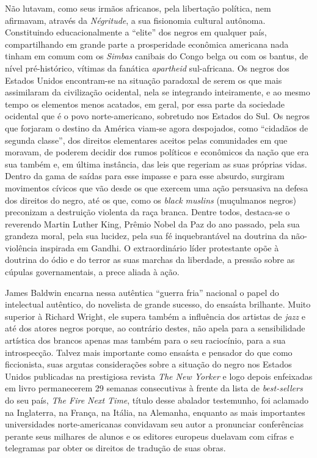 \documentclass[
  letterpaper,
  DIV=11,
  numbers=noendperiod]{scrreprt}
\begin{document}
Não lutavam, como seus irmãos africanos, pela libertação política, nem
afirmavam, através da \emph{Négritude}, a sua fisionomia cultural
autônoma. Constituindo educacionalmente a ``elite'' dos negros em
qualquer país, compartilhando em grande parte a prosperidade econômica
americana nada tinham em comum com os \emph{Simbas} canibais do Congo
belga ou com os bantus, de nível pré-histórico, vítimas da fanática
\emph{apartheid} sul-africana. Os negros dos Estados Unidos encontram-se
na situação paradoxal de serem os que mais assimilaram da civilização
ocidental, nela se integrando inteiramente, e ao mesmo tempo os
elementos menos acatados, em geral, por essa parte da sociedade
ocidental que é o povo norte-americano, sobretudo nos Estados do Sul. Os
negros que forjaram o destino da América viam-se agora despojados, como
``cidadãos de segunda classe'', dos direitos elementares aceitos pelas
comunidades em que moravam, de poderem decidir dos rumos políticos e
econômicos da nação que era sua também e, em última instância, das leis
que regeriam as suas próprias vidas. Dentro da gama de saídas para esse
impasse e para esse absurdo, surgiram movimentos cívicos que vão desde
os que exercem uma ação persuasiva na defesa dos direitos do negro, até
os que, como os \emph{black muslins} (muçulmanos negros) preconizam a
destruição violenta da raça branca. Dentre todos, destaca-se o reverendo
Martin Luther King, Prêmio Nobel da Paz do ano passado, pela sua
grandeza moral, pela sua lucidez, pela sua fé inquebrantável na doutrina
da não-violência inspirada em Gandhi. O extraordinário líder protestante
opõe à doutrina do ódio e do terror as suas marchas da liberdade, a
pressão sobre as cúpulas governamentais, a prece aliada à ação.

James Baldwin encarna nessa autêntica ``guerra fria'' nacional o papel
do intelectual autêntico, do novelista de grande sucesso, do ensaísta
brilhante. Muito superior à Richard Wright, ele supera também a
influência dos artistas de \emph{jazz} e até dos atores negros porque,
ao contrário destes, não apela para a sensibilidade artística dos
brancos apenas mas também para o seu raciocínio, para a sua
introspecção. Talvez mais importante como ensaísta e pensador do que
como ficcionista, suas argutas considerações sobre a situação do negro
nos Estados Unidos publicadas na prestigiosa revista \emph{The New
Yorker} e logo depois enfeixadas em livro permanecerem 29 semanas
consecutivas à frente da lista de \emph{best-sellers} do seu país,
\emph{The Fire Next Time}, título desse abalador testemunho, foi
aclamado na Inglaterra, na França, na Itália, na Alemanha, enquanto as
mais importantes universidades norte-americanas convidavam seu autor a
pronunciar conferências perante seus milhares de alunos e os editores
europeus duelavam com cifras e telegramas par obter os direitos de
tradução de suas obras.
\end{document}
